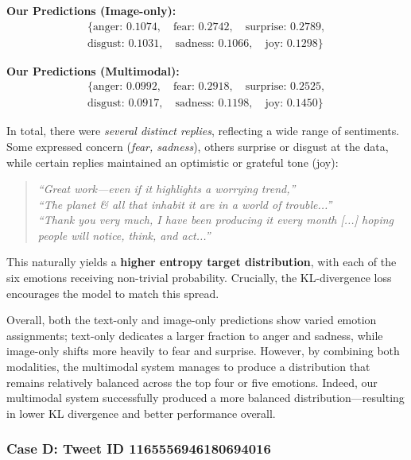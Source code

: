 \noindent\textbf{Our Predictions (Image-only):}
\[
\begin{aligned}
\{\text{anger: } 0.1074, \quad \text{fear: } 0.2742, \quad \text{surprise: } 0.2789, \\
\text{disgust: } 0.1031, \quad \text{sadness: } 0.1066, \quad \text{joy: } 0.1298\}
\end{aligned}
\]

\noindent\textbf{Our Predictions (Multimodal):}
\[
\begin{aligned}
\{\text{anger: } 0.0992, \quad \text{fear: } 0.2918, \quad \text{surprise: } 0.2525, \\
\text{disgust: } 0.0917, \quad \text{sadness: } 0.1198, \quad \text{joy: } 0.1450\}
\end{aligned}
\]

In total, there were \textit{several distinct replies}, reflecting a wide range of sentiments. Some expressed concern (\textit{fear, sadness}), others surprise or disgust at the data, while certain replies maintained an optimistic or grateful tone (joy):

\begin{quote}
\emph{``Great work—even if it highlights a worrying trend,''} \\
\emph{``The planet \& all that inhabit it are in a world of trouble...''} \\
\emph{``Thank you very much, I have been producing it every month [...] hoping people will notice, think, and act...''}
\end{quote}

This naturally yields a \textbf{higher entropy target distribution}, with each of the six emotions receiving non-trivial probability. Crucially, the KL-divergence loss encourages the model to match this spread. 
\newline

Overall, both the text-only and image-only predictions show varied emotion assignments; text-only dedicates a larger fraction to anger and sadness, while image-only shifts more heavily to fear and surprise. However, by combining both modalities, the multimodal system manages to produce a distribution that remains relatively balanced across the top four or five emotions. Indeed, our multimodal system successfully produced a more balanced distribution—resulting in lower KL divergence and better performance overall.

\subsubsection*{Case D: Tweet ID 1165556946180694016}

